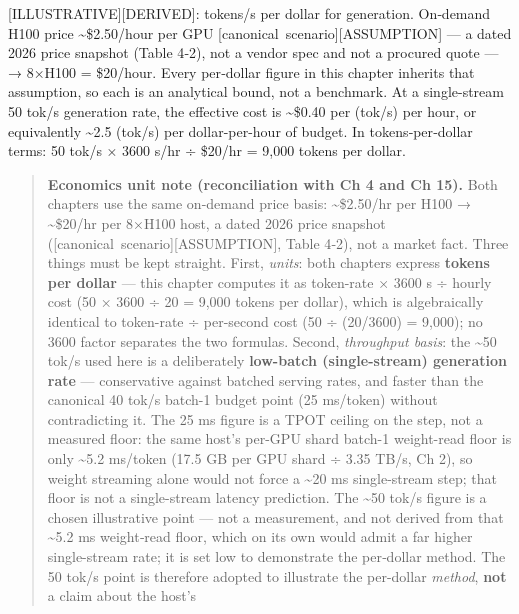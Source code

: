 \mbox{{[}ILLUSTRATIVE{]}}\hspace{0pt}\mbox{{[}DERIVED{]}}: tokens/s per dollar for generation.
On‑demand H100 price \textasciitilde\$2.50/hour per GPU \mbox{{[}canonical
scenario{]}}\hspace{0pt}\mbox{{[}ASSUMPTION{]}} --- a dated 2026 price snapshot (Table 4‑2),
not a vendor spec and not a procured quote --- → 8×H100 = \$20/hour.
Every per‑dollar figure in this chapter inherits that assumption, so
each is an analytical bound, not a benchmark. At a single-stream 50
tok/s generation rate, the effective cost is \textasciitilde\$0.40 per
(tok/s) per hour, or equivalently \textasciitilde2.5 (tok/s) per
dollar-per-hour of budget. In tokens‑per‑dollar terms: 50 tok/s × 3600
s/hr ÷ \$20/hr = 9,000 tokens per dollar.

\begin{quote}
\textbf{Economics unit note (reconciliation with Ch 4 and Ch 15).} Both
chapters use the same on-demand price basis: \textasciitilde\$2.50/hr
per H100 → \textasciitilde\$20/hr per 8×H100 host, a dated 2026 price
snapshot (\mbox{{[}canonical scenario{]}}\hspace{0pt}\mbox{{[}ASSUMPTION{]}}, Table 4‑2), not a
market fact. Three things must be kept straight. First, \emph{units}:
both chapters express \textbf{tokens per dollar} --- this chapter
computes it as token-rate × 3600 s ÷ hourly cost (50 × 3600 ÷ 20 = 9,000
tokens per dollar), which is algebraically identical to token-rate ÷
per-second cost (50 ÷ (20/3600) = 9,000); no 3600 factor separates the
two formulas. Second, \emph{throughput basis}: the \textasciitilde50
tok/s used here is a deliberately \textbf{low-batch (single-stream)
generation rate} --- conservative against batched serving rates, and
faster than the canonical 40 tok/s batch-1 budget point (25 ms/token)
without contradicting it. The 25 ms figure is a TPOT ceiling on the
step, not a measured floor: the same host's per-GPU shard batch-1
weight-read floor is only \textasciitilde5.2 ms/token (17.5 GB per GPU
shard ÷ 3.35 TB/s, Ch 2), so weight streaming alone would not force a
\textasciitilde20 ms single-stream step; that floor is not a
single-stream latency prediction. The \textasciitilde50 tok/s figure is
a chosen illustrative point --- not a measurement, and not derived from
that \textasciitilde5.2 ms weight‑read floor, which on its own would
admit a far higher single-stream rate; it is set low to demonstrate the
per‑dollar method. The 50 tok/s point is therefore adopted to illustrate
the per-dollar \emph{method}, \textbf{not} a claim about the host's

\end{quote}

